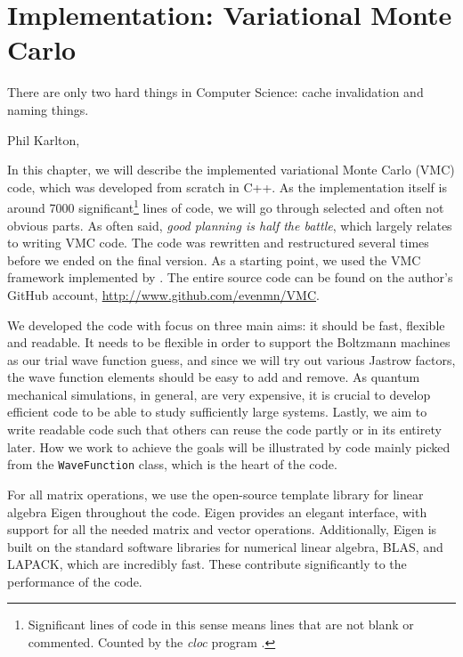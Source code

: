 \chapter{Implementation: Variational Monte Carlo} \label{chp:WFE}
\epigraph{There are only two hard things in Computer Science: cache invalidation and naming things.}{Phil Karlton, \supercite{fowler_bliki:_nodate}}
\iffalse
\begin{figure}[H]
	\centering
	\texttt{[image: Images/example.png]}
	\caption{Caption}
\end{figure}
\fi

In this chapter, we will describe the implemented variational Monte Carlo (VMC) code, which was developed from scratch in C++. As the implementation itself is around 7000 significant\footnote{Significant lines of code in this sense means lines that are not blank or commented. Counted by the \textit{cloc} program \supercite{aldanial_cloc_2019}.} lines of code, we will go through selected and often not obvious parts. As often said, \textit{good planning is half the battle}, which largely relates to writing VMC code. The code was rewritten and restructured several times before we ended on the final version. As a starting point, we used the VMC framework implemented by \citet{ledum_simple_2016}. The entire source code can be found on the author's GitHub account, \url{http://www.github.com/evenmn/VMC}.

We developed the code with focus on three main aims: it should be fast, flexible and readable. It needs to be flexible in order to support the Boltzmann machines as our trial wave function guess, and since we will try out various Jastrow factors, the wave function elements should be easy to add and remove. As quantum mechanical simulations, in general, are very expensive, it is crucial to develop efficient code to be able to study sufficiently large systems. Lastly, we aim to write readable code such that others can reuse the code partly or in its entirety later.  How we work to achieve the goals will be illustrated by code mainly picked from the \lstinline{WaveFunction} class, which is the heart of the code.

For all matrix operations, we use the open-source template library for linear algebra Eigen throughout the code. Eigen provides an elegant interface, with support for all the needed matrix and vector operations. Additionally, Eigen is built on the standard software libraries for numerical linear algebra, BLAS, and LAPACK, which are incredibly fast. These contribute significantly to the performance of the code. 

